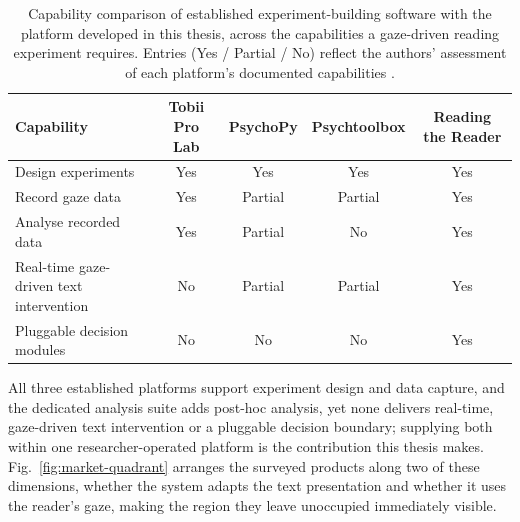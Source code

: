 \begin{table}[htbp]
\centering
\small
\caption[Capability comparison with established experiment software.]{Capability comparison of established experiment-building software with the platform developed in this thesis, across the capabilities a gaze-driven reading experiment requires. Entries (Yes / Partial / No) reflect the authors' assessment of each platform's documented capabilities \cite{tobii2025prolab, peirce2019psychopy, brainard1997psychtoolbox}.}
\label{tab:capability-matrix}
\setlength{\tabcolsep}{4pt}
\begin{tabular}{p{4.5cm}cccc}
\toprule
Capability & Tobii Pro Lab & PsychoPy & Psychtoolbox & Reading the Reader \\
\midrule
Design experiments & Yes & Yes & Yes & Yes \\
Record gaze data & Yes & Partial & Partial & Yes \\
Analyse recorded data & Yes & Partial & No & Yes \\
Real-time gaze-driven text intervention & No & Partial & Partial & Yes \\
Pluggable decision modules & No & No & No & Yes \\
\bottomrule
\end{tabular}
\end{table}

All three established platforms support experiment design and data capture, and the dedicated analysis suite adds post-hoc analysis, yet none delivers real-time, gaze-driven text intervention or a pluggable decision boundary; supplying both within one researcher-operated platform is the contribution this thesis makes.
Fig.~\ref{fig:market-quadrant} arranges the surveyed products along two of these dimensions, whether the system adapts the text presentation and whether it uses the reader's gaze, making the region they leave unoccupied immediately visible.

